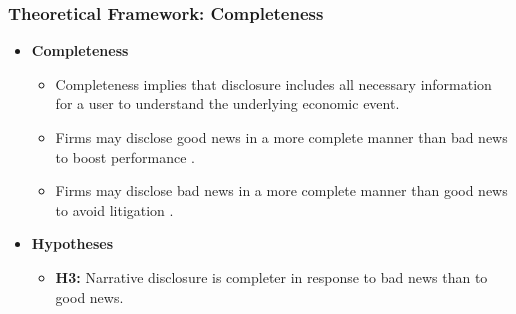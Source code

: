 \documentclass{beamer}
\begin{document}
\begin{frame}
	\frametitle{Theoretical Framework: Completeness}
	\begin{itemize}
		\item \textbf{Completeness}
		
		\begin{itemize}
			\item Completeness implies that disclosure includes all necessary information for a user to understand the underlying economic event.
			\item Firms may disclose good news in a more complete manner than bad news to boost performance \citep{teohEarningsManagementUnderperformance1998, langVoluntaryDisclosureEquity2000}.
			\item Firms may disclose bad news in a more complete manner than good news to avoid litigation \citep{skinnerWhyFirmsVoluntarily1994, skinnerEarningsDisclosuresStockholder1997}.
		\end{itemize}
		
		\item \textbf{Hypotheses}
		
		\begin{itemize}
			\item  \textbf{H3:} Narrative disclosure is completer in response to bad news than to good news.
		\end{itemize}
		
	\end{itemize}
\end{frame}
%
%
%
%
\end{document}
